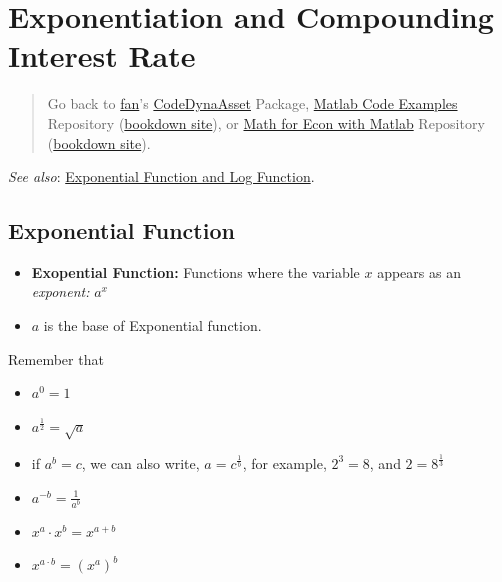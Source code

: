 \documentclass[
]{book}
\begin{document}
\hypertarget{exponentiation-and-compounding-interest-rate}{%
\section{Exponentiation and Compounding Interest Rate}\label{exponentiation-and-compounding-interest-rate}}

\begin{quote}
Go back to \href{http://fanwangecon.github.io/}{fan}'s \href{https://fanwangecon.github.io/CodeDynaAsset/}{CodeDynaAsset} Package, \href{https://fanwangecon.github.io/M4Econ/}{Matlab Code Examples} Repository (\href{https://fanwangecon.github.io/M4Econ/bookdown}{bookdown site}), or \href{https://fanwangecon.github.io/Math4Econ/}{Math for Econ with Matlab} Repository (\href{https://fanwangecon.github.io/Math4Econ/bookdown}{bookdown site}).
\end{quote}

\emph{See also}: \href{https://fanwangecon.github.io/Math4Econ/explog/exolog.html}{Exponential Function and Log
Function}.

\hypertarget{exponential-function}{%
\subsection{\texorpdfstring{\textbf{Exponential Function}}{Exponential Function}}\label{exponential-function}}

\begin{itemize}
\item
  \textbf{Exopential Function:} Functions where the variable \(x\) appears as
  an \emph{exponent:} \(a^x\)
\item
  \(a\) is the base of Exponential function.
\end{itemize}

Remember that

\begin{itemize}
\item
  \(\displaystyle a^0 =1\)
\item
  \(\displaystyle a^{\frac{1}{2}} =\sqrt{a}\)
\item
  if \(a^b =c\), we can also write, \(a=c^{\frac{1}{b}}\), for example,
  \(2^3 =8\), and \(2=8^{\frac{1}{3}}\)
\item
  \(\displaystyle a^{-b} =\frac{1}{a^b }\)
\item
  \(\displaystyle x^a \cdot x^b =x^{a+b}\)
\item
  \(\displaystyle x^{a\cdot b} =(x^a )^b\)
\end{itemize}
\end{document}
